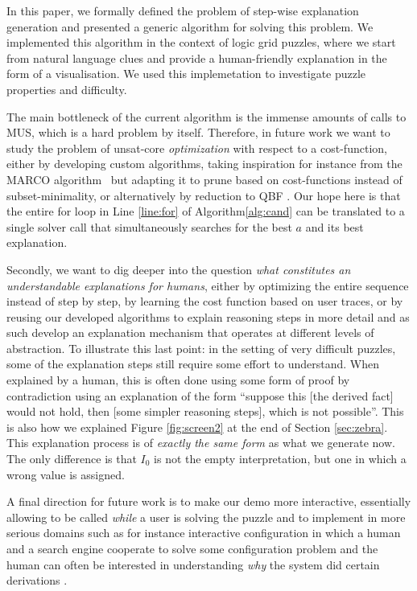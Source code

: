 In this paper, we formally defined the problem of step-wise explanation generation and presented a generic algorithm for solving this problem. 
We implemented this algorithm in the context of logic grid puzzles, where we start from natural language clues and provide a human-friendly explanation in the form of a visualisation.
We used this implemetation to investigate puzzle properties and difficulty. 


The main bottleneck of the current algorithm is the immense amounts of calls to MUS, which is a hard problem by itself. 
Therefore, in future work we want to study the problem of unsat-core \emph{optimization} with respect to a cost-function, either by  developing custom algorithms, taking inspiration for instance from the MARCO algorithm~\cite{liffiton2013enumerating} but adapting it to prune based on cost-functions instead of subset-minimality, or alternatively by reduction to QBF \cite{QBF}.
Our hope here is that the entire for loop in Line \ref{line:for} of Algorithm\ref{alg:cand} can be translated to a single solver call that simultaneously searches for the best $a$ and its best explanation. 

Secondly, we want to dig deeper into the question \emph{what constitutes an understandable explanations for humans}, either by optimizing the entire sequence instead of step by step, by learning the cost function based on user traces, or by reusing our developed algorithms to explain reasoning steps in more detail and as such develop an explanation mechanism that operates at different levels of abstraction. 
To illustrate this last point: in the setting of very difficult puzzles, some of the explanation steps still require some effort to understand. 
When explained by a human, this is often done using some form of proof by contradiction using an explanation of the form ``suppose this [the derived fact] would not hold, then [some simpler reasoning steps], which is not possible''. This is also how we explained Figure \ref{fig:screen2} at the end of Section \ref{sec:zebra}.
This explanation process is of \emph{exactly the same form} as what we generate now. The only difference is that $I_0$ is not the empty interpretation, but one in which a wrong value is assigned. 

A final direction for future work is to make our demo more interactive, essentially allowing \ourtool to be called \emph{while} a user is solving the puzzle and to implement in more serious domains such as for instance interactive configuration in which a human and a search engine cooperate to solve some configuration problem and the human can often be interested in understanding \emph{why} the system did certain derivations \cite{DBLP:journals/tplp/HertumDJD17,DBLP:conf/bnaic/CarbonnelleADVD19}. 


